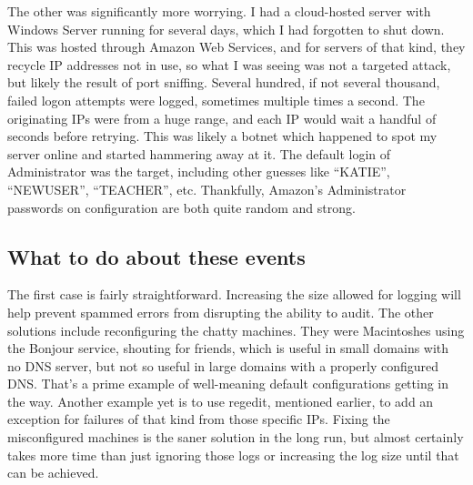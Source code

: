 The other was significantly more worrying. I had a cloud-hosted server
with Windows Server running for several days, which I had forgotten to
shut down. This was hosted through Amazon Web Services, and for servers
of that kind, they recycle IP addresses not in use, so what I was seeing
was not a targeted attack, but likely the result of port sniffing.
Several hundred, if not several thousand, failed logon attempts were
logged, sometimes multiple times a second. The originating IPs were from
a huge range, and each IP would wait a handful of seconds before
retrying. This was likely a botnet which happened to spot my server
online and started hammering away at it. The default login of
Administrator was the target, including other guesses like ``KATIE'',
``NEWUSER'', ``TEACHER'', etc. Thankfully, Amazon's Administrator
passwords on configuration are both quite random and strong.

\hypertarget{what-to-do-about-these-events}{%
\subsection{What to do about these
events}\label{what-to-do-about-these-events}}

The first case is fairly straightforward. Increasing the size allowed
for logging will help prevent spammed errors from disrupting the ability
to audit. The other solutions include reconfiguring the chatty machines.
They were Macintoshes using the Bonjour service, shouting for friends,
which is useful in small domains with no DNS server, but not so useful
in large domains with a properly configured DNS. That's a prime example
of well-meaning default configurations getting in the way. Another
example yet is to use regedit, mentioned earlier, to add an exception
for failures of that kind from those specific IPs. Fixing the
misconfigured machines is the saner solution in the long run, but almost
certainly takes more time than just ignoring those logs or increasing
the log size until that can be achieved.


